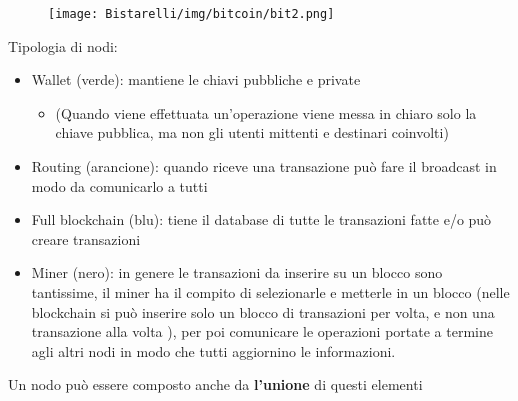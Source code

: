 \begin{figure}[H]
	\centering
    \texttt{[image: Bistarelli/img/bitcoin/bit2.png]}
\end{figure}
Tipologia di nodi:
\begin{itemize}
    \item Wallet (verde): mantiene le chiavi pubbliche e private
    
    \begin{itemize}
        \item (Quando viene effettuata un’operazione viene messa in chiaro solo la chiave pubblica, ma non gli utenti mittenti e destinari coinvolti)
    \end{itemize}
    
    \item Routing (arancione): quando riceve una transazione può fare il broadcast in modo da comunicarlo a tutti
    
    \item Full blockchain (blu): tiene il database di tutte le transazioni fatte e/o può creare transazioni
    
    \item Miner (nero): in genere le transazioni da inserire su un blocco sono tantissime, il miner ha il compito di selezionarle e metterle in un blocco (nelle blockchain si può inserire solo un blocco di transazioni per volta, e non una transazione alla volta ), per poi comunicare le operazioni portate a termine agli altri nodi in modo che tutti aggiornino le informazioni.
\end{itemize}
Un nodo può essere composto anche da \textbf{l'unione} di questi elementi 
